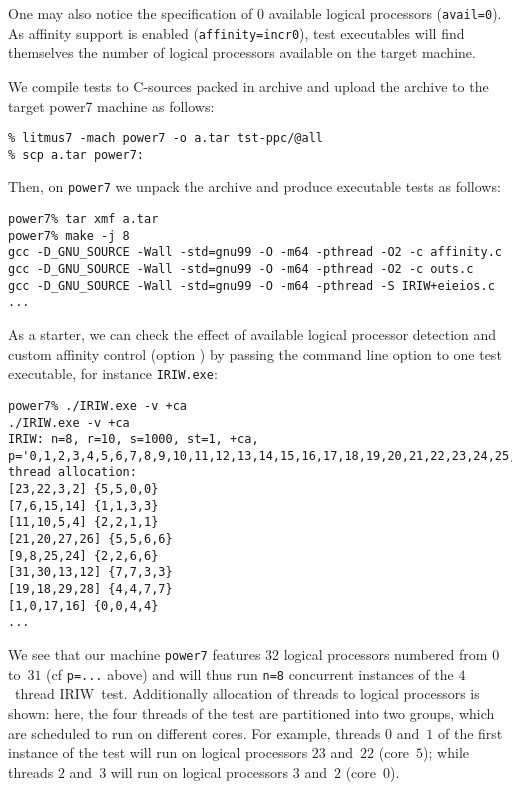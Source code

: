 One may also notice the specification of $0$ available logical processors
(\verb+avail=0+).
As affinity support is enabled (\verb+affinity=incr0+),
test executables will find themselves
the number of logical processors available on the target machine.


We compile tests to C-sources packed in archive 
and upload the archive to the target power7 machine as follows:
\begin{verbatim}
% litmus7 -mach power7 -o a.tar tst-ppc/@all
% scp a.tar power7:
\end{verbatim}
Then, on \texttt{power7} we unpack the archive and produce executable tests
as follows:
\begin{verbatim}
power7% tar xmf a.tar
power7% make -j 8
gcc -D_GNU_SOURCE -Wall -std=gnu99 -O -m64 -pthread -O2 -c affinity.c
gcc -D_GNU_SOURCE -Wall -std=gnu99 -O -m64 -pthread -O2 -c outs.c
gcc -D_GNU_SOURCE -Wall -std=gnu99 -O -m64 -pthread -S IRIW+eieios.c
...
\end{verbatim}

As a starter, we can check the effect of available logical processor detection
and custom affinity control (option )
by passing the command line option  to one test executable,
for instance
\texttt{IRIW.exe}:
\begin{verbatim}
power7% ./IRIW.exe -v +ca
./IRIW.exe -v +ca
IRIW: n=8, r=10, s=1000, st=1, +ca, p='0,1,2,3,4,5,6,7,8,9,10,11,12,13,14,15,16,17,18,19,20,21,22,23,24,25,26,27,28,29,30,31'
thread allocation:
[23,22,3,2] {5,5,0,0}
[7,6,15,14] {1,1,3,3}
[11,10,5,4] {2,2,1,1}
[21,20,27,26] {5,5,6,6}
[9,8,25,24] {2,2,6,6}
[31,30,13,12] {7,7,3,3}
[19,18,29,28] {4,4,7,7}
[1,0,17,16] {0,0,4,4}
...
\end{verbatim}
We see that our machine \texttt{power7} features $32$ logical processors
numbered from $0$ to~$31$
(cf \verb+p=...+ above) and will thus run \verb+n=8+ concurrent
instances of the $4$~thread IRIW~test.
Additionally allocation of threads to logical processors is shown:
here, the four threads of the test are partitioned into two groups, which are
scheduled to run on different cores. For example, threads $0$ and~$1$ of
the first instance of the test will run on logical processors $23$ and~$22$
(core~$5$); while threads $2$ and~$3$ will run on logical
processors $3$ and~$2$ (core~$0$).

